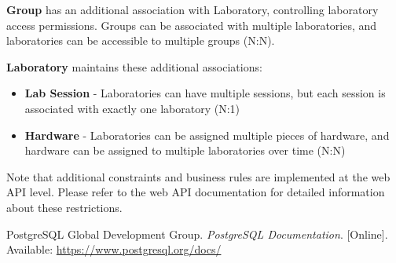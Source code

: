 \documentclass[a4paper,twoside,11pt]{article}
\begin{document}
\textbf{Group} has an additional association with Laboratory, controlling laboratory access permissions. Groups can be associated with multiple laboratories, and laboratories can be accessible to multiple groups (N:N).

\textbf{Laboratory} maintains these additional associations:
\begin{itemize}
    \item \textbf{Lab Session} - Laboratories can have multiple sessions, but each session is associated with exactly one laboratory (N:1)
    \item \textbf{Hardware} - Laboratories can be assigned multiple pieces of hardware, and hardware can be assigned to multiple laboratories over time (N:N)
\end{itemize}

Note that additional constraints and business rules are implemented at the web API level. Please refer to the web API documentation for detailed information about these restrictions.


\renewcommand{\refname}{\section{Bibliography}}
\begin{thebibliography}{1}
 PostgreSQL Global Development Group. \textit{PostgreSQL Documentation}. [Online]. Available: \url{https://www.postgresql.org/docs/}
\end{thebibliography}
\end{document}
